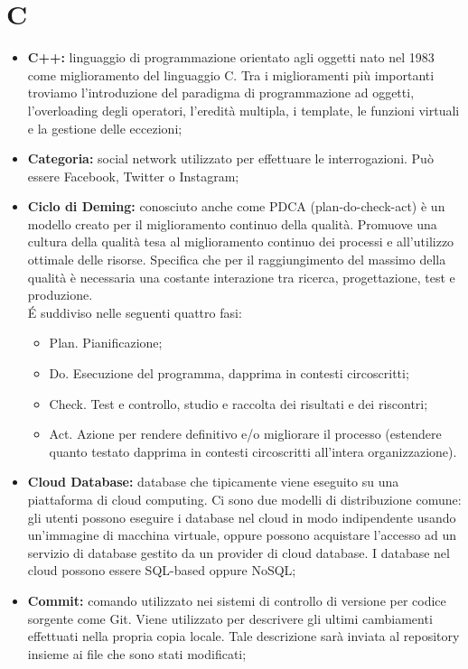 \section*{\Huge C} %
\label{sec:c}
	\begin{itemize}
		\item \textbf{C++:} linguaggio di programmazione orientato agli oggetti nato nel 1983 come miglioramento del linguaggio C. Tra i miglioramenti più importanti troviamo l'introduzione del paradigma di programmazione ad oggetti, l'overloading degli operatori, l'eredità multipla, i template, le funzioni virtuali e la gestione delle eccezioni;
		\item \textbf{Categoria:} social network utilizzato per effettuare le interrogazioni. Può essere Facebook, Twitter o Instagram;
		\item \textbf{Ciclo di Deming:} conosciuto anche come PDCA (plan-do-check-act) è un modello creato per il miglioramento continuo della qualità. Promuove una cultura della qualità tesa al miglioramento continuo dei processi e all'utilizzo ottimale delle risorse. Specifica che per il raggiungimento del massimo della qualità è necessaria una costante interazione tra ricerca, progettazione, test e produzione.\\
		É suddiviso nelle seguenti quattro fasi:
			\begin{itemize}
				\item Plan. Pianificazione;
				\item Do. Esecuzione del programma, dapprima in contesti circoscritti;
				\item Check. Test e controllo, studio e raccolta dei risultati e dei riscontri;
				\item Act. Azione per rendere definitivo e/o migliorare il processo (estendere quanto testato dapprima in contesti circoscritti all'intera organizzazione).
			\end{itemize}
		\item \textbf{Cloud Database:} database che tipicamente viene eseguito su una piattaforma di cloud computing. Ci sono due modelli di distribuzione comune: gli utenti possono eseguire i database nel cloud in modo indipendente usando un'immagine di macchina virtuale, oppure possono acquistare l'accesso ad un servizio di database gestito da un provider di cloud database. I database nel cloud possono essere SQL-based oppure NoSQL;
		\item \textbf{Commit:} comando utilizzato nei sistemi di controllo di versione per codice sorgente come Git. Viene utilizzato per descrivere gli ultimi cambiamenti effettuati nella propria copia locale. Tale descrizione sarà inviata al repository insieme ai file che sono stati modificati;

\end{itemize}
